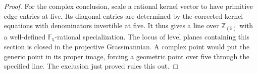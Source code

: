\begin{proof}
For the complex conclusion, scale a rational kernel vector to have
primitive edge entries at five. Its diagonal entries are determined
by the corrected-kernel equations with denominators invertible at five.
It thus gives a line over \(\mathbb Z_{(5)}\) with a well-defined
\(\mathbb F_5\)-rational specialization. The locus of level planes
containing this section is closed in the projective Grassmannian.
A complex point would put the generic point in its proper image,
forcing a geometric point over five through the specified line.
The exclusion just proved rules this out.
\end{proof}

